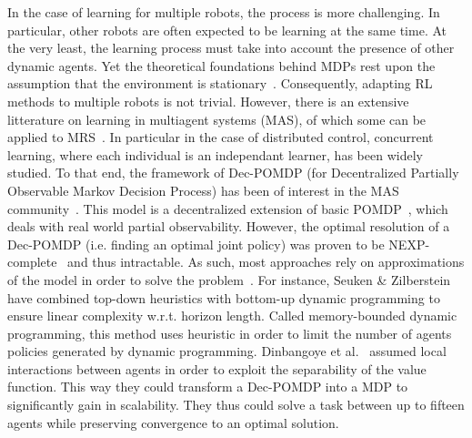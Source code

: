     In the case of learning for multiple robots, the process is more challenging. In particular, other robots are often expected to be learning at the same time. At the very least, the learning process must take into account the presence of other dynamic agents. Yet the theoretical foundations behind MDPs rest upon the assumption that the environment is stationary~\parencite{Littman1994, Parker2008}. Consequently, adapting RL methods to multiple robots is not trivial. However, there is an extensive litterature on learning in multiagent systems (MAS), of which some can be applied to MRS~\parencite{Stone2000, Yang2005, Panait2005}. In particular in the case of distributed control, concurrent learning, where each individual is an independant learner, has been widely studied. To that end, the framework of Dec-POMDP (for Decentralized Partially Observable Markov Decision Process) has been of interest in the MAS community~\parencite{Bernstein2002, Amato2013}. This model is a decentralized extension of basic POMDP~\parencite{Astrom1965}, which deals with real world partial observability. However, the optimal resolution of a Dec-POMDP (i.e. finding an optimal joint policy) was proven to be NEXP-complete~\parencite{Bernstein2002} and thus intractable. As such, most approaches rely on approximations of the model in order to solve the problem~\parencite{Beynier2011, Amato2013}. For instance, Seuken \& Zilberstein~\parencite{Seuken2007} have combined top-down heuristics with bottom-up dynamic programming to ensure linear complexity w.r.t. horizon length. Called memory-bounded dynamic programming, this method uses heuristic in order to limit the number of agents policies generated by dynamic programming. Dinbangoye et al.~\parencite{Dibangoye2014} assumed local interactions between agents in order to exploit the separability of the value function. This way they could transform a Dec-POMDP into a MDP to significantly gain in scalability. They thus could solve a task between up to fifteen agents while preserving convergence to an optimal solution.


